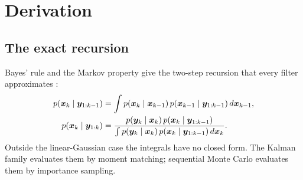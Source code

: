 \section{Derivation}

\subsection{The exact recursion}
Bayes' rule and the Markov property give the two-step recursion that every filter approximates
\cite[\S{}II]{arulampalam2002}:
\begin{align}
  p(\bm{x}_k \mid \bm{y}_{1:k-1}) &= \int p(\bm{x}_k \mid \bm{x}_{k-1})\, p(\bm{x}_{k-1}\mid\bm{y}_{1:k-1})\, d\bm{x}_{k-1},
  \label{eq:pfb-chapman}\\
  p(\bm{x}_k \mid \bm{y}_{1:k}) &= \frac{p(\bm{y}_k\mid\bm{x}_k)\, p(\bm{x}_k\mid\bm{y}_{1:k-1})}
                                  {\int p(\bm{y}_k\mid\bm{x}_k)\, p(\bm{x}_k\mid\bm{y}_{1:k-1})\, d\bm{x}_k}.
  \label{eq:pfb-bayes}
\end{align}
Outside the linear-Gaussian case the integrals have no closed form.  The Kalman family evaluates
them by moment matching; sequential Monte Carlo evaluates them by importance sampling.

